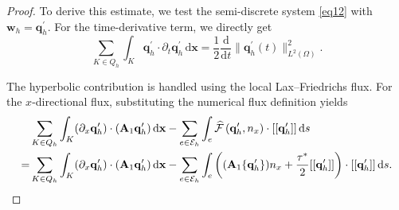 \documentclass[pdflatex,sn-mathphys-num]{sn-jnl}%
\theoremstyle{thmstyleone}%
\theoremstyle{thmstyletwo}%
\theoremstyle{thmstylethree}%
\begin{document}
\begin{proof}
To derive this estimate, we test the semi-discrete system \eqref{eq12} with $\mathbf{w}_h=\mathbf{q}_h^\prime$. For the time-derivative term, we directly get
\[
\sum_{K\in Q_h}\int_K \mathbf{q}_h^{\prime} \cdot \partial_t \mathbf{q}_h^{\prime} \,\mathrm{d} \mathbf{x}
=
\frac{1}{2}\frac{\mathrm{d}}{\mathrm{d}t}\|\mathbf{q}^{\prime}_h(t)\|_{L^2(\Omega)}^2.
\]


The hyperbolic contribution is handled using the local Lax--Friedrichs flux. For the $x$-directional flux, substituting the numerical flux definition yields
\begin{equation}\notag
\begin{aligned}
&\sum_{K \in Q_h} \int_K (\partial_x\mathbf{q}_h^{\prime}) \cdot (\mathbf{A}_1\mathbf{q}_h^{\prime}) \, \mathrm{d} \mathbf{x} -\sum_{e \in \mathcal{E}_h} \int_e \widehat{\mathcal{F}}\left(\mathbf{q}_h^{\prime},n_x\right) \cdot [[\mathbf{q}_h^{\prime}]] \, \mathrm{d} s \\
=& \sum_{K \in Q_h} \int_K (\partial_x \mathbf{q}_h^{\prime}) \cdot (\mathbf{A}_{1} \mathbf{q}_h^{\prime})\, \mathrm{d} \mathbf{x} -\sum_{e \in \mathcal{E}_h} \int_e  \left( (\mathbf{A}_{1}\{\mathbf{q}_h^{\prime}\})n_x + \frac{\tau^*}{2} [[\mathbf{q}_h^{\prime}]]\right)\cdot [[\mathbf{q}_h^{\prime}]] \, \mathrm{d} s.
\end{aligned}
\end{equation}


\end{proof}
\end{document}
